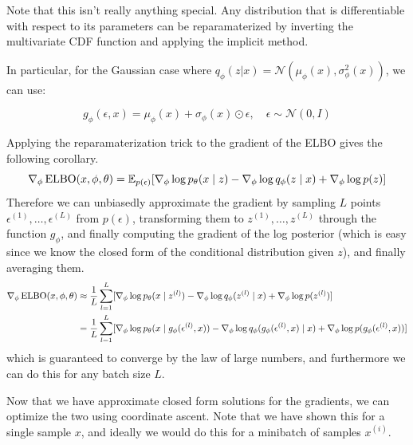  Note that this isn't really anything special. Any distribution that is differentiable with respect to its parameters can be reparamaterized by inverting the multivariate CDF function and applying the implicit method. 

  \begin{example}
    In particular, for the Gaussian case where $q_\phi(z|x) = \mathcal{N}(\mu_\phi(x), \sigma^2_\phi(x))$, we can use:

    \begin{equation}
      g_\phi(\epsilon, x) = \mu_\phi(x) + \sigma_\phi(x) \odot \epsilon, \quad \epsilon \sim \mathcal{N}(0, I)
    \end{equation}
  \end{example}

  \begin{corollary}
    Applying the reparamaterization trick to the gradient of the ELBO gives the following corollary. 
    \begin{equation}
      \nabla_\phi \elbo(x, \phi, \theta) = \mathbb{E}_{p(\epsilon)}[\nabla_\phi \log p_\theta (x \mid z) - \nabla_\phi \log q_\phi (z \mid x) + \nabla_\phi \log p(z)]
    \end{equation}
    Therefore we can unbiasedly approximate the gradient by sampling $L$ points $\epsilon^{(1)}, \ldots, \epsilon^{(L)}$ from $p(\epsilon)$, transforming them to $z^{(1)}, \ldots, z^{(L)}$ through the function $g_\phi$, and finally computing the gradient of the log posterior (which is easy since we know the closed form of the conditional distribution given $z$), and finally averaging them. 
    \begin{align*}
      \nabla_\phi \elbo(x, \phi, \theta) & \approx \frac{1}{L} \sum_{l=1}^L [\nabla_\phi \log p_\theta (x \mid z^{(l)}) - \nabla_\phi \log q_\phi (z^{(l)} \mid x) + \nabla_\phi \log p(z^{(l)})] \\
                                         & = \frac{1}{L} \sum_{l=1}^L [\nabla_\phi \log p_\theta (x \mid g_\phi (\epsilon^{(l)}, x)) - \nabla_\phi \log q_\phi (g_\phi (\epsilon^{(l)}, x) \mid x) + \nabla_\phi \log p(g_\phi (\epsilon^{(l)}, x))]
    \end{align*}
    which is guaranteed to converge by the law of large numbers, and furthermore we can do this for any batch size $L$. 
  \end{corollary}

  Now that we have approximate closed form solutions for the gradients, we can optimize the two using coordinate ascent. Note that we have shown this for a single sample $x$, and ideally we would do this for a minibatch of samples $x^{(i)}$. 

